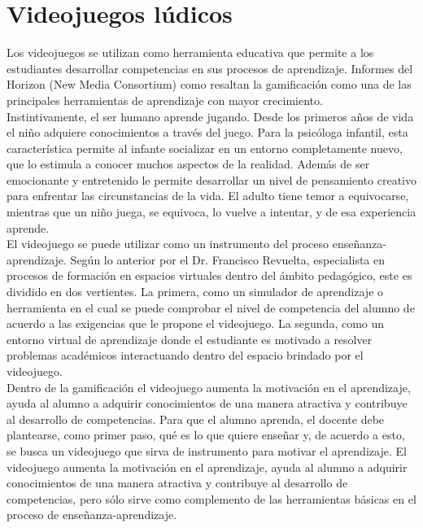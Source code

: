 \section{Videojuegos lúdicos}

Los videojuegos se utilizan como herramienta educativa que permite a los estudiantes desarrollar competencias en sus procesos de aprendizaje. Informes del Horizon (New Media Consortium) como \cite[Games and gamification]{vid07} resaltan la gamificación como una de las principales herramientas de aprendizaje con mayor crecimiento.
\\[1pt]

Instintivamente, el ser humano aprende jugando. Desde los primeros años de vida el niño adquiere conocimientos a través del juego. Para la psicóloga infantil, esta característica permite al infante socializar en un entorno completamente nuevo, que lo estimula a conocer muchos aspectos de la realidad. Además de ser emocionante y entretenido le permite desarrollar un nivel de pensamiento creativo para enfrentar las circunstancias de la vida. El adulto tiene temor a equivocarse, mientras que un niño juega, se equivoca, lo vuelve a intentar, y de esa experiencia aprende.
\\[1pt]

El videojuego se puede utilizar como un instrumento del proceso enseñanza-aprendizaje. Según lo anterior por el Dr. Francisco Revuelta, especialista en procesos de formación en espacios virtuales dentro del ámbito pedagógico, este es dividido en dos vertientes. La primera, como un simulador de aprendizaje o herramienta en el cual se puede comprobar el nivel de competencia del alumno de acuerdo a las exigencias que le propone el videojuego. La segunda, como un entorno virtual de aprendizaje donde el estudiante es motivado a resolver problemas académicos interactuando dentro del espacio brindado por el videojuego\cite{vid06}.
\\[1pt]

Dentro de la gamificación el videojuego aumenta la motivación en el aprendizaje, ayuda al alumno a adquirir conocimientos de una manera atractiva y contribuye al desarrollo de competencias. Para que el alumno aprenda, el docente debe plantearse, como primer paso, qué es lo que quiere enseñar y, de acuerdo a esto, se busca un videojuego que sirva de instrumento para motivar el aprendizaje. El videojuego aumenta la motivación en el aprendizaje, ayuda al alumno a adquirir conocimientos de una manera atractiva y contribuye al desarrollo de competencias, pero sólo sirve como complemento de las herramientas básicas en el proceso de enseñanza-aprendizaje. 
\\[1pt]
